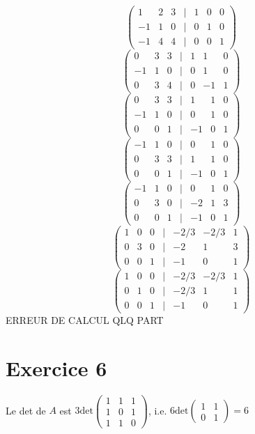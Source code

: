 \documentclass[a4paper, titlepage]{article}
\begin{document}
	$$ \begin{pmatrix} 1&2&3&|&1&0&0\\-1&1&0&|&0&1&0\\-1&4&4&|&0&0&1 \end{pmatrix}  $$
	$$ \begin{pmatrix} 0&3&3&|&1&1&0\\-1&1&0&|&0&1&0\\0&3&4&|&0&-1&1 \end{pmatrix}  $$
	$$ \begin{pmatrix} 0&3&3&|&1&1&0\\-1&1&0&|&0&1&0\\0&0&1&|&-1&0&1 \end{pmatrix}  $$
	$$ \begin{pmatrix} -1&1&0&|&0&1&0\\0&3&3&|&1&1&0\\0&0&1&|&-1&0&1 \end{pmatrix}  $$
	$$ \begin{pmatrix} -1&1&0&|&0&1&0\\0&3&0&|&-2&1&3\\0&0&1&|&-1&0&1 \end{pmatrix}  $$
	$$ \begin{pmatrix} 1&0&0&|&-2/3&-2/3&1\\0&3&0&|&-2&1&3\\0&0&1&|&-1&0&1 \end{pmatrix}  $$
	$$ \begin{pmatrix} 1&0&0&|&-2/3&-2/3&1\\0&1&0&|&-2/3&1&1\\0&0&1&|&-1&0&1 \end{pmatrix}  $$
	ERREUR DE CALCUL QLQ PART
	\section*{Exercice 6}
	Le det de $A$ est $3\mathrm{det}\begin{pmatrix} 1&1&1\\1&0&1\\1&1&0 \end{pmatrix}$, i.e. $6\mathrm{det}\begin{pmatrix} 1&1\\0&1 \end{pmatrix} = 6 $
\end{document}
